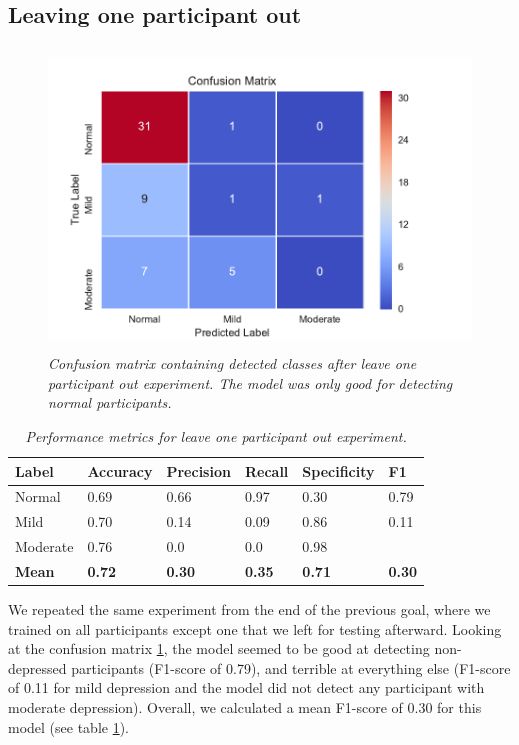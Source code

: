 \subsection{Leaving one participant out}

\begin{figure}[h]
\begin{center}
      \includegraphics[height=8cm]{img/depression_class/leave_one_out.pdf}
      \caption{\textit{Confusion matrix containing detected classes after leave one participant out experiment. The model was only good for detecting normal participants.}}
      \label{figure:depression_class_conf_loo}
\end{center}
\end{figure}

\begin{table}[h]
\begin{center}
      \begin{tabular}{|l|l|l|l|l|l|}
            \hline
            \bfseries Label & \bfseries Accuracy & \bfseries Precision & \bfseries Recall & \bfseries Specificity & \bfseries F1 \\\hline
            Normal & 0.69 & 0.66 & 0.97 & 0.30 & 0.79 \\\hline
            Mild & 0.70 & 0.14 & 0.09 & 0.86 & 0.11 \\\hline
            Moderate & 0.76 & 0.0 & 0.0 & 0.98 &  \\\hline
            \bfseries Mean & \bfseries 0.72 & \bfseries 0.30 & \bfseries 0.35 & \bfseries 0.71 & \bfseries 0.30 \\\hline
      \end{tabular}
      \caption{\textit{Performance metrics for leave one participant out experiment.}}
      \label{table:depression_class_performance_loo}
\end{center}
\end{table}
We repeated the same experiment from the end of the previous goal, where we trained on all participants except one that we left for testing afterward. Looking at the confusion matrix \ref{figure:depression_class_conf_loo}, the model seemed to be good at detecting non-depressed participants (F1-score of 0.79), and terrible at everything else (F1-score of 0.11 for mild depression and the model did not detect any participant with moderate depression). Overall, we calculated a mean F1-score of 0.30 for this model (see table \ref{table:depression_class_performance_loo}). 


